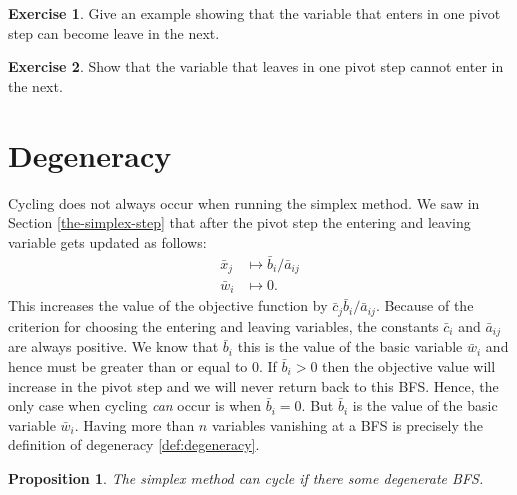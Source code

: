 \documentclass[
]{book}
\newtheorem{proposition}{Proposition}[chapter]
\theoremstyle{definition}
\theoremstyle{definition}
\theoremstyle{definition}
\newtheorem{exercise}{Exercise}[chapter]
\theoremstyle{definition}
\theoremstyle{remark}
\begin{document}
\begin{exercise}
Give an example showing that the variable that enters in one pivot step can become leave in the next.
\end{exercise}

\begin{exercise}
Show that the variable that leaves in one pivot step cannot enter in the next.
\end{exercise}

\hypertarget{degeneracy}{%
\section{Degeneracy}\label{degeneracy}}

Cycling does not always occur when running the simplex method. We saw in Section \ref{the-simplex-step} that after the pivot step the entering and leaving variable gets updated as follows:
\begin{align*}
  \bar{x}_j & \mapsto \bar{b}_i/\bar{a}_{ij} \\
  \bar{w}_i & \mapsto 0.
\end{align*}
This increases the value of the objective function by \(\bar{c}_j \bar{b}_i/\bar{a}_{ij}\).
Because of the criterion for choosing the entering and leaving variables, the constants \(\bar{c}_i\) and \(\bar{a}_{ij}\) are always positive. We know that \(\bar{b}_i\) this is the value of the basic variable \(\bar{w}_i\) and hence must be greater than or equal to 0.
If \(\bar{b}_i > 0\) then the objective value will increase in the pivot step and we will never return back to this BFS.
Hence, the only case when cycling \emph{can} occur is when \(\bar{b}_i = 0\).
But \(\bar{b}_i\) is the value of the basic variable \(\bar{w}_i\).
Having more than \(n\) variables vanishing at a BFS is precisely the definition of degeneracy \ref{def:degeneracy}.

\begin{proposition}
The simplex method can cycle if there some degenerate BFS.
\end{proposition}
\end{document}
